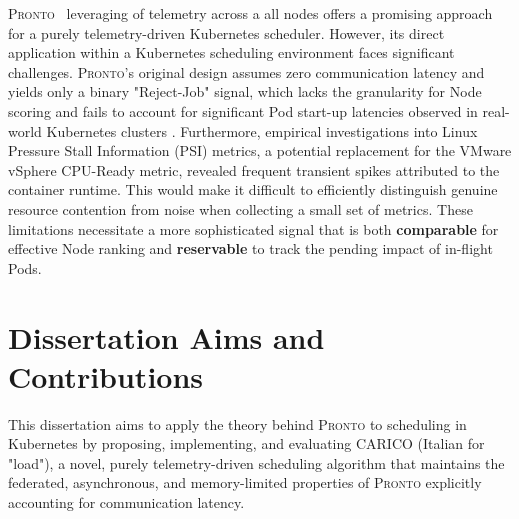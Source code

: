 \textsc{Pronto}~\cite{grammenos_pronto_2021} leveraging of telemetry across a
all nodes offers a promising approach for a purely telemetry-driven Kubernetes
scheduler. However, its direct application within a Kubernetes scheduling
environment faces significant challenges. \textsc{Pronto}'s original design
assumes zero communication latency and yields only a binary "Reject-Job" signal,
which lacks the granularity for Node scoring and fails to account
for significant Pod start-up latencies observed in real-world Kubernetes clusters
\cite{qadeer_scaling_2022}. Furthermore, empirical investigations into Linux
Pressure Stall Information (PSI) metrics, a potential replacement for the VMware
vSphere CPU-Ready metric, revealed frequent transient spikes attributed to the
container runtime. This would make it difficult to efficiently distinguish
genuine resource contention from noise when collecting a small set of metrics.
These limitations necessitate a more sophisticated signal that is both
\textbf{comparable} for effective Node ranking and \textbf{reservable} to track
the pending impact of in-flight Pods.

\section{Dissertation Aims and Contributions}

This dissertation aims to apply the theory behind \textsc{Pronto} to scheduling
in Kubernetes by proposing, implementing, and evaluating \textsc{CARICO} (Italian
for "load"), a novel, purely telemetry-driven scheduling algorithm that
maintains the federated, asynchronous, and memory-limited properties of
\textsc{Pronto} explicitly accounting for communication latency.


